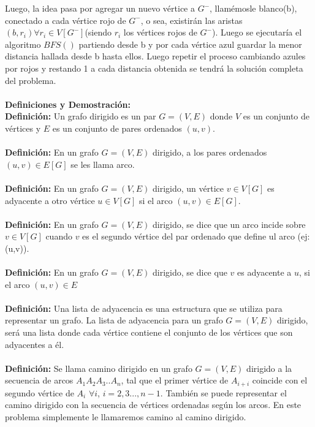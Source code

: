 \documentclass[12pt]{article}
\begin{document}
Luego, la idea pasa por agregar un nuevo v\'ertice a $G^-$, llam\'emosle blanco(b), conectado a cada v\'ertice rojo de $G^-$, o sea, existir\'an las aristas $(b, r_i) \forall r_i\in V[G^-]$(siendo $r_i$ los v\'ertices rojos de $G^-$).
 Luego se ejecutar\'ia el algoritmo $BFS()$ partiendo desde b y por cada v\'ertice azul guardar la menor distancia hallada desde b hasta ellos. Luego repetir el proceso
cambiando azules por rojos y restando 1 a cada distancia obtenida se tendr\'a la soluci\'on completa del problema.\\
\\

 \textbf{Definiciones y Demostraci\'on:} \\

\textbf{Definici\'on:} Un grafo dirigido es un par $G=(V,E)$ donde $V$ es un conjunto de v\'ertices y $E$ es un conjunto de pares ordenados $(u,v)$.\\
\\
\textbf{Definici\'on:} En un grafo $G=(V,E)$ dirigido, a los pares ordenados $(u,v) \in E[G]$ se les llama arco.\\
\\
\textbf{Definici\'on:}  En un grafo $G=(V,E)$ dirigido, un v\'ertice $v \in V[G]$ es adyacente a otro v\'ertice $u \in V [G]$ si el arco $(u, v) \in E[G]$.\\
\\
\textbf{Definici\'on:}  En un grafo $G=(V,E)$ dirigido, se dice que un arco incide sobre $v\in V[G]$ cuando $v$ es el segundo v\'ertice del par ordenado que define ul arco (ej: (u,v)). \\
\\
\textbf{Definici\'on:}  En un grafo $G=(V,E)$ dirigido, se dice que $v$ es adyacente a $u$, si el arco $(u,v)\in E$\\
\\
\textbf{Definici\'on:} Una lista de adyacencia es una estructura que se utiliza para representar un grafo.
 La lista de adyacencia para un grafo $G=(V,E)$ dirigido, ser\'a una lista donde cada v\'ertice contiene el conjunto de los v\'ertices que son adyacentes a \'el.\\ 
\\
\textbf{Definici\'on:} Se llama camino dirigido en un grafo $G=(V,E)$ dirigido a la secuencia de arcos $A_1A_2A_3..A_n$, tal que el primer v\'ertice de $A_{i+i}$
coincide con el segundo v\'ertice de $A_i$ $\forall i$, $i = 2, 3 ... ,n-1$. Tambi\'en se puede representar el camino dirigido con la secuencia de v\'ertices ordenadas seg\'un los arcos. En este problema simplemente le llamaremos camino al camino dirigido.\\
\end{document}
